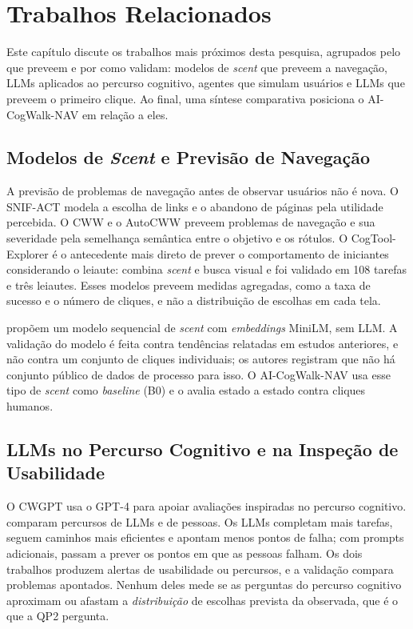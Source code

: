 \documentclass[12pt,oneside,a4paper,chapter=TITLE,english,brazil]{abntex2}
\newcommand{\proj}{AI-CogWalk-NAV}
\begin{document}
\chapter{Trabalhos Relacionados}
\label{cap:relacionados}

Este capítulo discute os trabalhos mais próximos desta pesquisa, agrupados pelo que preveem e por como validam: modelos de \textit{scent} que preveem a navegação, LLMs aplicados ao percurso cognitivo, agentes que simulam usuários e LLMs que preveem o primeiro clique. Ao final, uma síntese comparativa posiciona o \proj{} em relação a eles.

\section{Modelos de \textit{Scent} e Previsão de Navegação}

A previsão de problemas de navegação antes de observar usuários não é nova. O SNIF-ACT \cite{fu2007snifact} modela a escolha de links e o abandono de páginas pela utilidade percebida. O CWW e o AutoCWW \cite{blackmon2002cww,blackmon2005autocww} preveem problemas de navegação e sua severidade pela semelhança semântica entre o objetivo e os rótulos. O CogTool-Explorer \cite{teo2012cogtoolexplorer} é o antecedente mais direto de prever o comportamento de iniciantes considerando o leiaute: combina \textit{scent} e busca visual e foi validado em 108 tarefas e três leiautes. Esses modelos preveem medidas agregadas, como a taxa de sucesso e o número de cliques, e não a distribuição de escolhas em cada tela.

 propõem um modelo sequencial de \textit{scent} com \textit{embeddings} MiniLM, sem LLM. A validação do modelo é feita contra tendências relatadas em estudos anteriores, e não contra um conjunto de cliques individuais; os autores registram que não há conjunto público de dados de processo para isso. O \proj{} usa esse tipo de \textit{scent} como \textit{baseline} (B0) e o avalia estado a estado contra cliques humanos.

\section{LLMs no Percurso Cognitivo e na Inspeção de Usabilidade}

O CWGPT \cite{bisante2024cwgpt} usa o GPT-4 para apoiar avaliações inspiradas no percurso cognitivo.  comparam percursos de LLMs e de pessoas. Os LLMs completam mais tarefas, seguem caminhos mais eficientes e apontam menos pontos de falha; com prompts adicionais, passam a prever os pontos em que as pessoas falham. Os dois trabalhos produzem alertas de usabilidade ou percursos, e a validação compara problemas apontados. Nenhum deles mede se as perguntas do percurso cognitivo aproximam ou afastam a \emph{distribuição} de escolhas prevista da observada, que é o que a QP2 pergunta.
\end{document}
